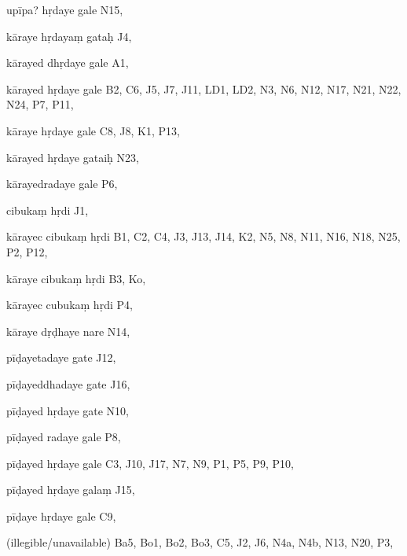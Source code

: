 \begin{marma}[hp03_065]


\item[upīpa? hṛdaye gale] N15,
\item[kāraye hṛdayaṃ gataḥ] J4,
\item[kārayed dhṛdaye gale] A1,  
\item[kārayed hṛdaye gale] B2, C6, J5, J7, J11, LD1, LD2, N3, N6, N12, N17, N21, N22, N24, P7, P11, 
\item[kāraye hṛdaye gale] C8, J8, K1, P13, 
\item[kārayed hṛdaye gataiḥ] N23,
\item[kārayedradaye gale] P6,
\item[cibukaṃ hṛdi] J1,
\item[kārayec cibukaṃ hṛdi] B1, C2, C4, J3, J13, J14, K2, N5, N8, N11, N16, N18, N25, P2, P12, 
\item[kāraye cibukaṃ hṛdi] B3, Ko, 
\item[kārayec cubukaṃ hṛdi] P4,
\item[kāraye dṛḍhaye nare] N14,
\item[pīḍayetadaye gate] J12,
\item[pīḍayeddhadaye gate] J16,
\item[pīḍayed hṛdaye gate] N10,
\item[pīḍayed radaye gale] P8,
\item[pīḍayed hṛdaye gale] C3, J10, J17, N7, N9, P1, P5, P9, P10, 
\item[pīḍayed hṛdaye galaṃ] J15,
\item[pīḍaye hṛdaye gale] C9,
\item[(illegible/unavailable)] Ba5, Bo1, Bo2, Bo3, C5, J2, J6, N4a, N4b, N13, N20, P3,

  \begin{description}
  \end{description}

\end{marma}

